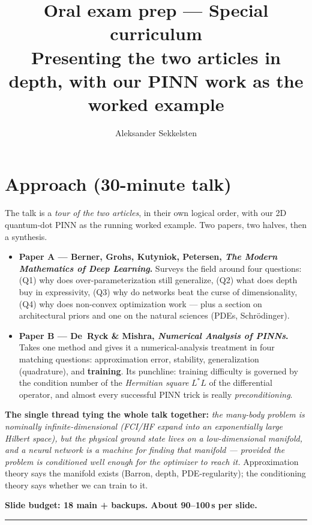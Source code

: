 \documentclass[11pt]{article}
\title{\textbf{Oral exam prep --- Special curriculum}\\
\large Presenting the two articles in depth, with our PINN work as the worked example}
\author{Aleksander Sekkelsten}
\date{}
\begin{document}
\maketitle

\section*{Approach (30-minute talk)}

The talk is a \emph{tour of the two articles}, in their own logical order, with our 2D
quantum-dot PINN as the running worked example. Two papers, two halves, then a synthesis.

\begin{itemize}[leftmargin=*]
\item \textbf{Paper A --- Berner, Grohs, Kutyniok, Petersen, \emph{The Modern Mathematics of
Deep Learning}.} Surveys the field around four questions: (Q1) why does over-parameterization
still generalize, (Q2) what does depth buy in expressivity, (Q3) why do networks beat the curse
of dimensionality, (Q4) why does non-convex optimization work --- plus a section on architectural
priors and one on the natural sciences (PDEs, Schr\"odinger).
\item \textbf{Paper B --- De~Ryck \& Mishra, \emph{Numerical Analysis of PINNs}.} Takes one method
and gives it a numerical-analysis treatment in four matching questions: approximation error,
stability, generalization (quadrature), and \textbf{training}. Its punchline: training difficulty
is governed by the condition number of the \emph{Hermitian square} $L^\ast L$ of the differential
operator, and almost every successful PINN trick is really \emph{preconditioning}.
\end{itemize}

\textbf{The single thread tying the whole talk together:} \emph{the many-body problem is
nominally infinite-dimensional (FCI/HF expand into an exponentially large Hilbert space), but the
physical ground state lives on a low-dimensional manifold, and a neural network is a machine for
finding that manifold --- provided the problem is conditioned well enough for the optimizer to
reach it.} Approximation theory says the manifold exists (Barron, depth, PDE-regularity);
the conditioning theory says whether we can train to it.

\textbf{Slide budget: 18 main + backups. About 90--100\,s per slide.}

\vspace{1em}\hrule\vspace{1em}
\end{document}
